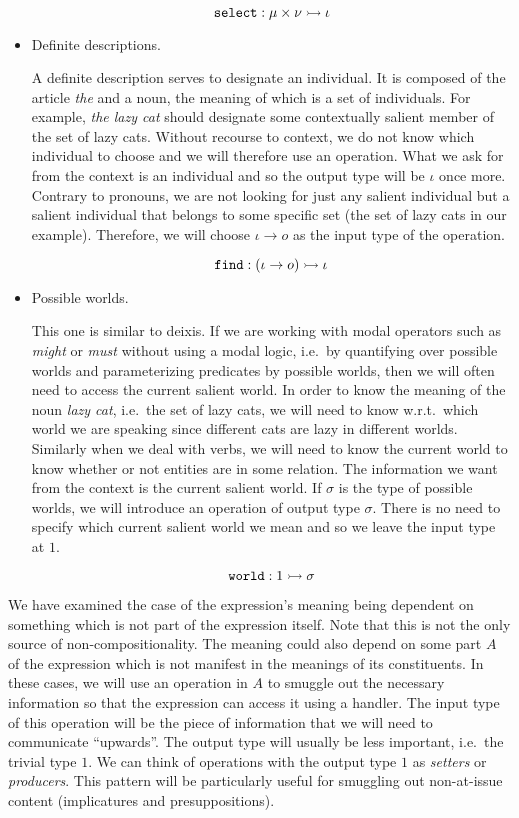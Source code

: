 \begin{itemize}
  $$
  \mathtt{select} : \mu \times \nu \rightarrowtail \iota
  $$

\item Definite descriptions.
  
  A definite description serves to designate an individual. It is composed
  of the article \emph{the} and a noun, the meaning of which is a set of
  individuals. For example, \emph{the lazy cat} should designate some
  contextually salient member of the set of lazy cats. Without recourse to
  context, we do not know which individual to choose and we will therefore
  use an operation. What we ask for from the context is an individual and
  so the output type will be $\iota$ once more. Contrary to pronouns, we
  are not looking for just any salient individual but a salient individual
  that belongs to some specific set (the set of lazy cats in our
  example). Therefore, we will choose $\iota \to o$ as the input type of
  the operation.
  
  $$
  \mathtt{find} : (\iota \to o) \rightarrowtail \iota
  $$

\item Possible worlds.
  
  This one is similar to deixis. If we are working with modal operators
  such as \emph{might} or \emph{must} without using a modal logic, i.e.\ by
  quantifying over possible worlds and parameterizing predicates by
  possible worlds, then we will often need to access the current salient
  world. In order to know the meaning of the noun \emph{lazy cat}, i.e.\
  the set of lazy cats, we will need to know w.r.t.\ which world we are
  speaking since different cats are lazy in different worlds. Similarly
  when we deal with verbs, we will need to know the current world to know
  whether or not entities are in some relation. The information we want
  from the context is the current salient world. If $\sigma$ is the type of
  possible worlds, we will introduce an operation of output type
  $\sigma$. There is no need to specify which current salient world we mean
  and so we leave the input type at $1$.
  
  $$
  \mathtt{world} : 1 \rightarrowtail \sigma
  $$
\end{itemize}

We have examined the case of the expression's meaning being dependent on
something which is not part of the expression itself. Note that this is not
the only source of non-compositionality. The meaning could also depend on
some part $A$ of the expression which is not manifest in the meanings of
its constituents. In these cases, we will use an operation in $A$ to
smuggle out the necessary information so that the expression can access it
using a handler. The input type of this operation will be the piece of
information that we will need to communicate ``upwards''. The output type
will usually be less important, i.e.\ the trivial type $1$. We can think of
operations with the output type $1$ as \emph{setters} or
\emph{producers}. This pattern will be particularly useful for smuggling
out non-at-issue content (implicatures and presuppositions).


